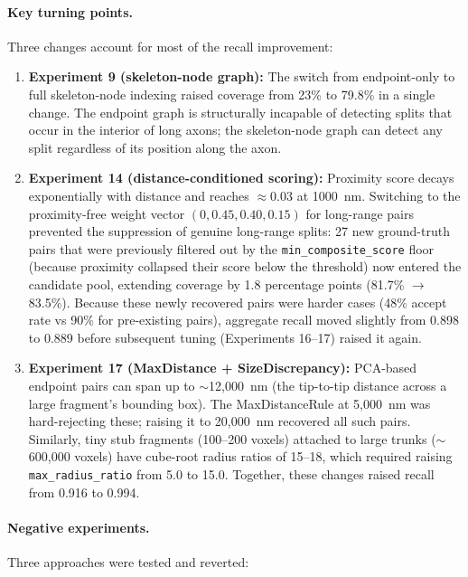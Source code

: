 \paragraph{Key turning points.}
Three changes account for most of the recall improvement:

\begin{enumerate}
  \item \textbf{Experiment 9 (skeleton-node graph):} The switch from endpoint-only
        to full skeleton-node indexing raised coverage from 23\% to 79.8\% in a
        single change. The endpoint graph is structurally incapable of detecting
        splits that occur in the interior of long axons; the skeleton-node graph
        can detect any split regardless of its position along the axon.

  \item \textbf{Experiment 14 (distance-conditioned scoring):} Proximity score
        decays exponentially with distance and reaches $\approx 0.03$ at 1000~nm.
        Switching to the proximity-free weight vector $(0, 0.45, 0.40, 0.15)$
        for long-range pairs prevented the suppression of genuine long-range
        splits: 27 new ground-truth pairs that were previously filtered out by
        the \texttt{min\_composite\_score} floor (because proximity collapsed
        their score below the threshold) now entered the candidate pool,
        extending coverage by 1.8 percentage points (81.7\% $\to$ 83.5\%).
        Because these newly recovered pairs were harder cases (48\% accept
        rate vs 90\% for pre-existing pairs), aggregate recall moved slightly
        from 0.898 to 0.889 before subsequent tuning (Experiments 16--17)
        raised it again.

  \item \textbf{Experiment 17 (MaxDistance + SizeDiscrepancy):} PCA-based
        endpoint pairs can span up to $\sim$12{,}000~nm (the tip-to-tip distance
        across a large fragment's bounding box). The MaxDistanceRule at 5{,}000~nm
        was hard-rejecting these; raising it to 20{,}000~nm recovered all such
        pairs. Similarly, tiny stub fragments (100--200 voxels) attached to large
        trunks ($\sim$600{,}000 voxels) have cube-root radius ratios of 15--18,
        which required raising \texttt{max\_radius\_ratio} from 5.0 to 15.0.
        Together, these changes raised recall from 0.916 to 0.994.
\end{enumerate}

\paragraph{Negative experiments.}
Three approaches were tested and reverted:

